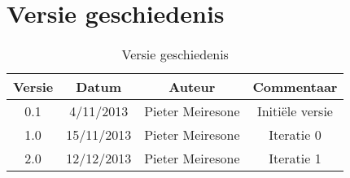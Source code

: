 \chapter{Versie geschiedenis}

\begin{table}[htbp]
	\centering
	\caption{Versie geschiedenis}
	\begin{tabular} {c|c|c|c}
		\textbf{Versie} & \textbf{Datum} 	& \textbf{Auteur} & \textbf{Commentaar} \\
		\hline
		0.1 			& 4/11/2013 		& Pieter Meiresone & Initi\"{e}le versie \\
		1.0 			& 15/11/2013		& Pieter Meiresone & Iteratie 0 \\
		2.0 			& 12/12/2013		& Pieter Meiresone & Iteratie 1 \\
	\end{tabular}
\end{table}